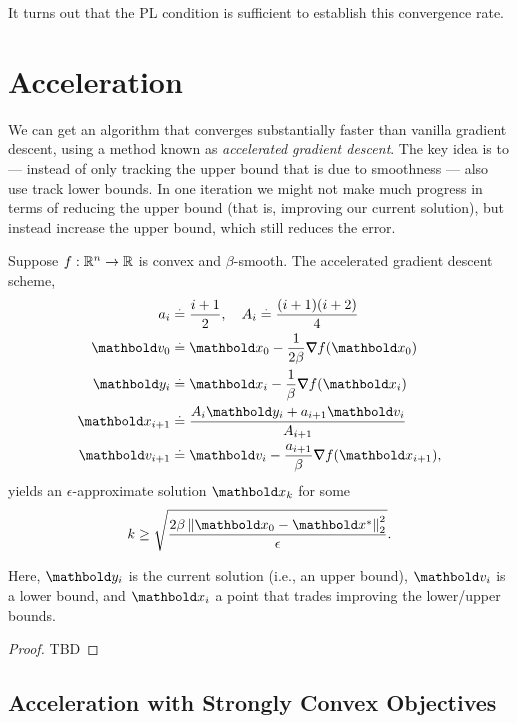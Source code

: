 \begin{rmk}
It turns out that the PL condition is sufficient to establish this convergence rate.
\end{rmk}

\section{Acceleration}

We can get an algorithm that converges substantially faster than vanilla gradient descent, using a method known as \emph{accelerated gradient descent}. The key idea is to --- instead of only tracking the upper bound that is due to smoothness --- also use track lower bounds. In one iteration we might not make much progress in terms of reducing the upper bound (that is, improving our current solution), but instead increase the upper bound, which still reduces the error.

\begin{thm} Suppose $f: \mathbb{R}^n \to \mathbb{R}$ is convex and $\beta$-smooth. The accelerated gradient descent scheme, \begin{align}\begin{split}
    a_i &\defeq \frac{i+1}{2}, \quad A_i \defeq \frac{(i+1)(i+2)}{4} \\
    \vv_0 &\defeq \vx_0 - \frac{1}{2\beta} \grad f(\vx_0) \\
    \vy_i &\defeq \vx_i - \frac{1}{\beta} \grad f(\vx_i) \\
    \vx_{i+1} &\defeq \frac{A_i\vy_i + a_{i+1}\vv_i}{A_{i+1}} \\
    \vv_{i+1} &\defeq \vv_i - \frac{a_{i+1}}{\beta} \grad f(\vx_{i+1}),
\end{split}\end{align} yields an $\epsilon$-approximate solution $\vx_k$ for some \begin{align*}
    k \geq \sqrt{\frac{2\beta\norm{\vx_0 - \s{\vx}}_2^2}{\epsilon}}.
\end{align*}
\end{thm} Here, $\vy_i$ is the current solution (i.e., an upper bound), $\vv_i$ is a lower bound, and $\vx_i$ a point that trades improving the lower/upper bounds.

\begin{proof}
TBD
\end{proof}

\subsection{Acceleration with Strongly Convex Objectives}

